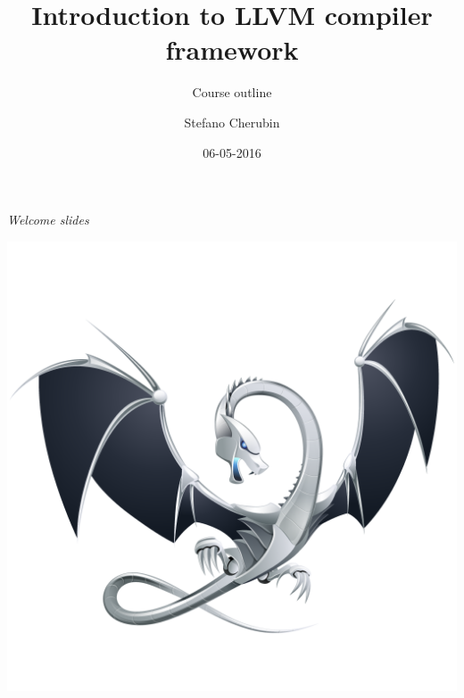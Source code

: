 \documentclass[10pt,mathserif]{beamer}
\author{Stefano Cherubin}
\institute{Politecnico di Milano}
\date{06-05-2016}
\title{Introduction to LLVM compiler framework}
\subtitle{Course outline}
\begin{document}
\begin{frame}
\maketitle
\begin{center}
\itshape\scriptsize Welcome slides
\end{center}
\end{frame}

\begin{frame}[plain]{}
  \begin{center}
    \vspace{-.1\textheight}
    \includegraphics[width=\textwidth]{img/00/logo.png}
  \end{center}
\end{frame}
\end{document}
